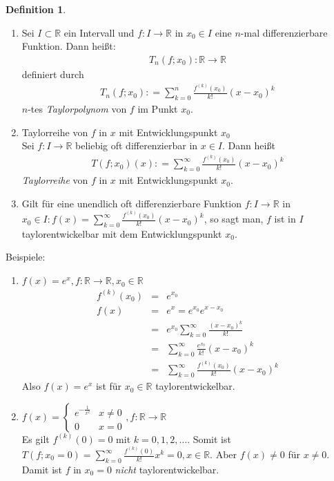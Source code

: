 \documentclass[ngerman,titlepage,twoside, parskip=half*]{scrreprt}
\newcommand*{\R}{\mathbb{R}}
\theoremstyle{plain}
\theoremstyle{definition}
\newtheorem{definition}{Definition}
\theoremstyle{remark}
\newcommand*{\coloneqq}{\mathrel{\mathop:}=}
\begin{document}
\begin{definition}
  \begin{enumerate}[(1)]
    \item Sei $I\subset\R$ ein Intervall und $f\colon I\rightarrow\R$ in $x_0
      \in I$ eine $n$-mal differenzierbare Funktion. Dann heißt:
      \begin{gather*}T_n(f;x_0)\colon\R\rightarrow\R\end{gather*}
      definiert durch
      \begin{gather*}T_n(f;x_0)\coloneqq\sum_{k=0}^n \frac{f^{(k)}(x_0)}{k!}(x-x_0)^k\end{gather*}
      $n$-tes \emph{Taylorpolynom} von $f$ im
      Punkt $x_0$.
    \item Taylorreihe von $f$ in $x$ mit Entwicklungspunkt $x_0$\\
      Sei $f\colon I\rightarrow\R$ beliebig oft differenzierbar in $x\in I$.
      Dann heißt
      \begin{gather*}T(f;x_0)(x)\coloneqq\sum_{k=0}^\infty \frac{f^{(k)}(x_0)}{k!}(x-x_0)^k\end{gather*}
      \emph{Taylorreihe} von $f$ in $x$ mit
      Entwicklungspunkt $x_0$.
    \item Gilt für eine unendlich oft differenzierbare Funktion 
      $f\colon I\rightarrow\R$ in $x_0\in I\colon f(x)=\sum_{k=0}^\infty
      \frac{f^{(k)}(x_0)}{k!}(x-x_0)^k$, so sagt man, $f$ ist in $I$
      taylorentwickelbar mit dem Entwicklungspunkt $x_0$.
  \end{enumerate}
\end{definition}

Beispiele:
\begin{enumerate}[(1)]
  \item $f(x)=e^x, f\colon\R\rightarrow\R, x_0\in\R$
    \begin{align*}
      f^{(k)}(x_0)&=& e^{x_0}\\
      f(x)&=& e^x=e^{x_0}e^{x-x_0}\\
      &=& e^{x_0}\sum_{k=0}^\infty \frac{(x-x_0)^k}{k!}\\
      &=& \sum_{k=0}^\infty \frac{e^{x_0}}{k!}(x-x_0)^k\\
      &=& \sum_{k=0}^\infty \frac{f^{(k)}(x_0)}{k!}(x-x_0)^k
    \end{align*}
    Also $f(x)=e^x$ ist für $x_0\in\R$ taylorentwickelbar.
  \item $f(x)=\begin{cases}
      e^{-\frac{1}{x^2}} & x\neq 0\\
      0 & x=0
    \end{cases}, f\colon\R\rightarrow\R$\\
    Es gilt $f^{(k)}(0)=0$ mit $k=0,1,2,\dots$. Somit ist $T(f;x_0=0)=
    \sum_{k=0}^\infty \frac{f^{(k)}(0)}{k!}x^k=0, x\in\R$. Aber $f(x)
    \neq 0$ für $x\neq 0$. Damit ist $f$ in $x_0=0$ \emph{nicht}
    taylorentwickelbar.
\end{enumerate}
\end{document}
